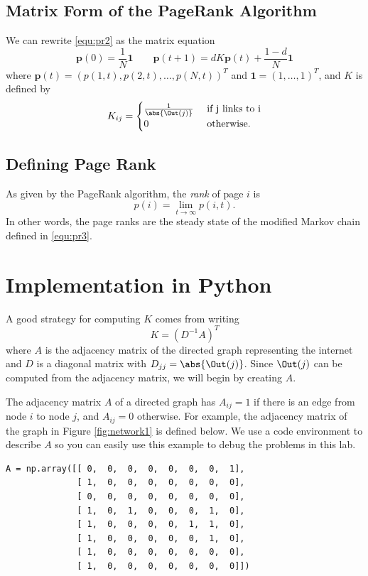 \subsection*{Matrix Form of the PageRank Algorithm}
We can rewrite \eqref{equ:pr2} as the matrix equation
\begin{equation}\label{equ:pr3}
\mathbf{p}(0)=\frac{1}{N}\mathbf{1} \qquad \mathbf{p}(t+1) = dK\mathbf{p}(t) + \frac{1-d}{N}\mathbf{1}
\end{equation}
where $\mathbf{p}(t)=(p(1,t), p(2,t), \ldots, p(N,t))^T$ and $\mathbf{1} = (1,\ldots, 1)^T$, and $K$ is defined by
\[K_{ij} = \begin{cases} \frac{1}{\abs{\Out(j)}} & \mbox{ if j links to i} \\
	0 & \mbox{ otherwise.} \end{cases}\]


\subsection*{Defining Page Rank}
As given by the PageRank algorithm, the \emph{rank} of page $i$ is
\[p(i) = \lim_{t\to \infty} p(i,t).\]
In other words, the page ranks are the steady state of the modified Markov chain defined in \eqref{equ:pr3}.



\section*{Implementation in Python}
A good strategy for computing $K$ comes from writing
\[
K = (D^{-1}A)^T
\]
where $A$ is the adjacency matrix of the directed graph representing the internet and $D$ is a diagonal matrix with $D_{jj}=\abs{\Out(j)}$.
Since $\Out(j)$ can be computed from the adjacency matrix, we will begin by creating $A$.

The adjacency matrix $A$ of a directed graph has $A_{ij}=1$ if there is an edge from node $i$ to node $j$, and $A_{ij}=0$ otherwise.
For example, the adjacency matrix of the graph in Figure \ref{fig:network1} is defined below.
We use a code environment to describe $A$ so you can easily use this example to debug the problems in this lab.
\begin{lstlisting}
A = np.array([[ 0,  0,  0,  0,  0,  0,  0,  1],
              [ 1,  0,  0,  0,  0,  0,  0,  0],
              [ 0,  0,  0,  0,  0,  0,  0,  0],
              [ 1,  0,  1,  0,  0,  0,  1,  0],
              [ 1,  0,  0,  0,  0,  1,  1,  0],
              [ 1,  0,  0,  0,  0,  0,  1,  0],
              [ 1,  0,  0,  0,  0,  0,  0,  0],
              [ 1,  0,  0,  0,  0,  0,  0,  0]])
\end{lstlisting}



